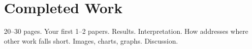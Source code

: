 \section{Completed Work}
20--30 pages.
Your first 1--2 papers.
Results.
Interpretation.
How addresses where other work falls short.
Images, charts, graphs.
Discussion.
